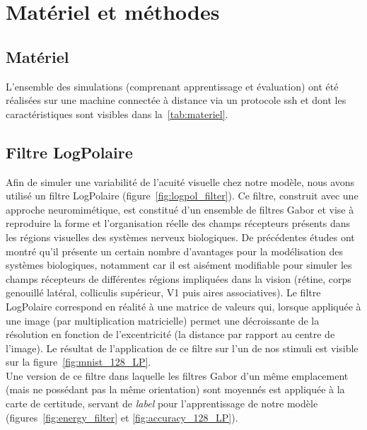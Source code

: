 
\chapter{Matériel et méthodes} %
\label{Materiel_methode} %

\section{Matériel}
L'ensemble des simulations (comprenant apprentissage et évaluation) ont été réalisées sur une machine connectée à distance via un protocole ssh et dont les caractéristiques sont visibles dans la~\autoref{tab:materiel}.	\\

\section{Filtre LogPolaire}
Afin de simuler une variabilité de l'acuité visuelle chez notre modèle, nous avons utilisé un filtre LogPolaire (figure~\ref{fig:logpol_filter}).
Ce filtre, construit avec une approche neuromimétique, est constitué d'un ensemble de filtres Gabor et vise à reproduire la forme et l'organisation réelle des champs récepteurs présents dans les régions visuelles des systèmes nerveux biologiques. De précédentes études ont montré qu'il présente un certain nombre d'avantages pour la modélisation des systèmes biologiques, notamment car il est aisément modifiable pour simuler les champs récepteurs de différentes régions impliquées dans la vision (rétine, corps genouillé latéral, colliculis supérieur, V1 puis aires associatives).
Le filtre LogPolaire correspond en réalité à une matrice de valeurs qui, lorsque appliquée à une image (par multiplication matricielle) permet une décroissante de la résolution en fonction de l'excentricité (la distance par rapport au centre de l'image). 
Le résultat de l'application de ce filtre sur l'un de nos stimuli est visible sur la figure~\ref{fig:mnist_128_LP}. \autocite{Freeman2011} \\
Une version de ce filtre dans laquelle les filtres Gabor d'un même emplacement (mais ne possédant pas la même orientation) sont moyennés est appliquée à la carte de certitude, servant de \textit{label} pour l'apprentissage de notre modèle (figures~\ref{fig:energy_filter} et \ref{fig:accuracy_128_LP}). \\

